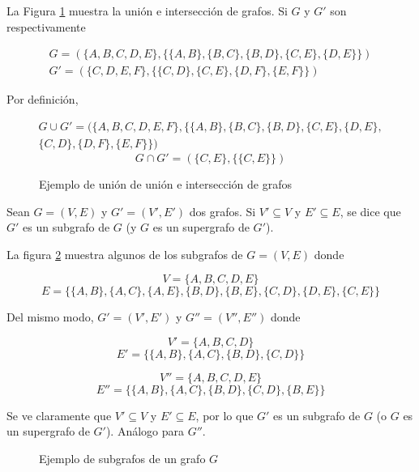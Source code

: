 \begin{ejemplo}
	La Figura \ref{fig:union_interseccion_grafo} muestra la unión e intersección de grafos. Si $G$ y $G'$ son respectivamente 
	
	\begin{eqnarray*}
		G = (\{A, B, C, D, E\}, \{ \{A,B\}, \{B,C\}, \{B,D\}, \{C,E\}, \{D, E\} \})\\
		G' = (\{C, D, E, F\}, \{ \{C,D\}, \{C,E\}, \{D,F\}, \{E,F\} \})
	\end{eqnarray*}
	
	Por definición,
	
	\begin{multline*}
	G \cup G' = (\{A, B, C, D, E, F\}, \{ \{A,B\}, \{B,C\}, \{B,D\}, \{C,E\}, \{D, E\}, \\
	\{C,D\}, \{D,F\},\{E,F\} \})
	\end{multline*}
	\[G \cap G' = (\{C, E\}, \{\{C,E\}\})\]
	
	
	\begin{figure}[htb]
		\centering
		\ejemplounionintersecciongrafo
		\caption{Ejemplo de unión de unión e intersección de grafos}
		\label{fig:union_interseccion_grafo}
	\end{figure}
	
\end{ejemplo}

\begin{defi}
	
	Sean $G = (V,E)$ y $G' = (V',E')$ dos grafos. Si $V' \subseteq V$ y $E' \subseteq E$, se dice que $G'$ es un subgrafo de $G$ (y $G$ es un supergrafo de $G'$).
	
\end{defi}

\begin{ejemplo}
	La figura \ref*{fig:subgrafo} muestra algunos de los subgrafos de $G= (V,E)$ donde
	
	\[ V  = \{A, B, C, D, E\}\]
	\[E = \{ \{A,B\}, \{A,C\}, \{A,E\}, \{B,D\}, \{B, E\},\{C,D\}, \{D,E\},\{C,E\} \} \]
	
	Del mismo modo, $G' = (V', E')$ y $G'' = (V'', E'')$ donde
	
	\[ V'  = \{A, B, C, D\}\]
	\[E' = \{ \{A,B\}, \{A,C\}, \{B,D\},\{C,D\} \} \]
	
	\[ V''  = \{A, B, C, D, E\}\]
	\[E'' = \{ \{A,B\}, \{A,C\}, \{B,D\},\{C,D\},\{B,E\} \} \]
	
	Se ve claramente que $V' \subseteq V$ y $E' \subseteq E$, por lo que $G'$ es un subgrafo de $G$ (o $G$ es un supergrafo de $G'$). Análogo para $G''$.
	
	
	\begin{figure}[htb]
		\centering
		\ejemplosubgrafo
		\caption[Ejemplo de subgrafos de un grafo]{Ejemplo de subgrafos de un grafo $G$}
		\label{fig:subgrafo}
	\end{figure}
	
\end{ejemplo}

